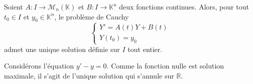 
  \begin{theorem}
    Soient $A : I \rightarrow \mathcal{M}_n(\mathbb{K})$ et $B : I \rightarrow \mathbb{K}^n$ deux fonctions continues. Alors, pour tout $t_0 \in I$ et $y_0 \in \mathbb{K}^n$, le problème de Cauchy
    \[ \begin{cases} Y' = A(t)Y + B(t) \\ Y(t_0) = y_0 \end{cases} \]
    admet une unique solution définie sur $I$ tout entier.
  \end{theorem}


  \begin{example}
    Considérons l'équation $y' - y = 0$. Comme la fonction nulle est solution maximale, il s'agit de l'unique solution qui s'annule sur $\mathbb{R}$.
  \end{example}


